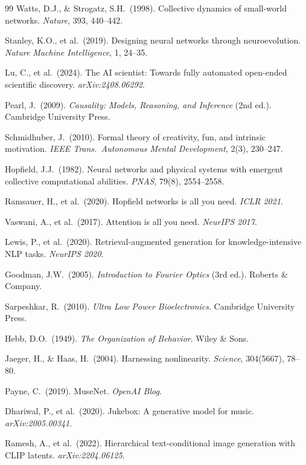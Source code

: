 \documentclass[12pt]{article}
\begin{document}
\begin{thebibliography}{99}
 Watts, D.J., \& Strogatz, S.H.\ (1998). Collective dynamics of small-world networks. \textit{Nature}, 393, 440--442.

 Stanley, K.O., et al.\ (2019). Designing neural networks through neuroevolution. \textit{Nature Machine Intelligence}, 1, 24--35.

 Lu, C., et al.\ (2024). The AI scientist: Towards fully automated open-ended scientific discovery. \textit{arXiv:2408.06292}.

 Pearl, J.\ (2009). \textit{Causality: Models, Reasoning, and Inference} (2nd ed.). Cambridge University Press.

 Schmidhuber, J.\ (2010). Formal theory of creativity, fun, and intrinsic motivation. \textit{IEEE Trans.\ Autonomous Mental Development}, 2(3), 230--247.

 Hopfield, J.J.\ (1982). Neural networks and physical systems with emergent collective computational abilities. \textit{PNAS}, 79(8), 2554--2558.

 Ramsauer, H., et al.\ (2020). Hopfield networks is all you need. \textit{ICLR 2021}.

 Vaswani, A., et al.\ (2017). Attention is all you need. \textit{NeurIPS 2017}.

 Lewis, P., et al.\ (2020). Retrieval-augmented generation for knowledge-intensive NLP tasks. \textit{NeurIPS 2020}.

 Goodman, J.W.\ (2005). \textit{Introduction to Fourier Optics} (3rd ed.). Roberts \& Company.

 Sarpeshkar, R.\ (2010). \textit{Ultra Low Power Bioelectronics}. Cambridge University Press.

 Hebb, D.O.\ (1949). \textit{The Organization of Behavior}. Wiley \& Sons.

 Jaeger, H., \& Haas, H.\ (2004). Harnessing nonlinearity. \textit{Science}, 304(5667), 78--80.

 Payne, C.\ (2019). MuseNet. \textit{OpenAI Blog}.

 Dhariwal, P., et al.\ (2020). Jukebox: A generative model for music. \textit{arXiv:2005.00341}.

 Ramesh, A., et al.\ (2022). Hierarchical text-conditional image generation with CLIP latents. \textit{arXiv:2204.06125}.


\end{thebibliography}
\end{document}
